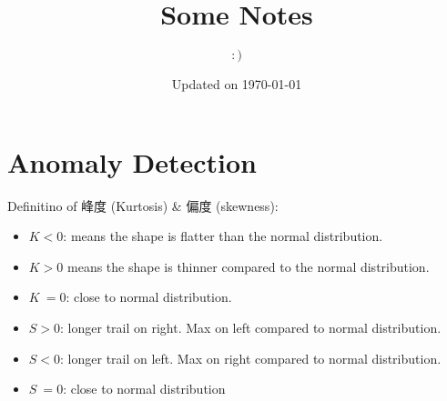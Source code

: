 \documentclass{article}
\title{Some Notes}
\author{$:)$}
\date{Updated on \today}
\begin{document}
\maketitle

\section{Anomaly Detection}
Definitino of 峰度 (Kurtosis) \& 偏度 (skewness):
\begin{itemize}
    \item $K < 0$: means the shape is flatter than the normal distribution.
    \item $K > 0$ means the shape is thinner compared to the normal distribution.
    \item $K ~= 0$: close to normal distribution.
   
    \item $S > 0$: longer trail on right. Max on left compared to normal distribution.
    \item $S < 0$: longer trail on left. Max on right compared to normal distribution.
    \item $S ~= 0$:  close to normal distribution
    
\end{itemize}

\end{document}
